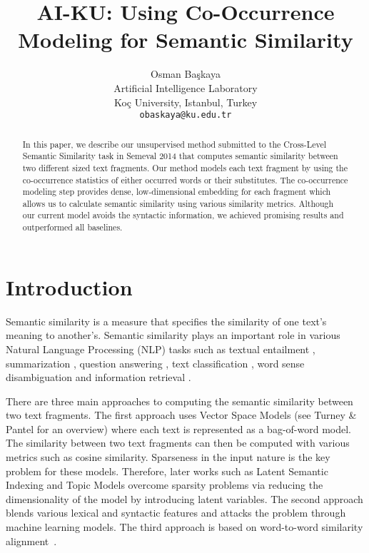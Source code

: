 \documentclass[11pt]{article}
\title{AI-KU: Using Co-Occurrence Modeling for Semantic Similarity}
\author{Osman Ba\c{s}kaya \\
	  Artificial Intelligence Laboratory \\
	  Ko\c{c} University, Istanbul, Turkey \\
  {\tt obaskaya@ku.edu.tr} \\
  }
\date{}
\begin{document}
\maketitle
\begin{abstract}

In this paper, we describe our unsupervised method submitted to the Cross-Level Semantic Similarity task in Semeval 2014 that computes semantic similarity between two different sized text fragments. Our method models each text fragment by using the co-occurrence statistics of either occurred words or their substitutes. The co-occurrence modeling step provides dense, low-dimensional embedding for each fragment which allows us to calculate semantic similarity using various similarity metrics. Although our current model avoids the syntactic information, we achieved promising results and outperformed all baselines.

\end{abstract}

\section{Introduction}
\label{intro}

Semantic similarity is a measure that specifies the similarity of one text's meaning to another's. Semantic similarity plays an important role in various Natural Language Processing (NLP) tasks such as textual entailment \cite{berant2012entail}, summarization \cite{lin2003summarization}, question answering \cite{surdeanu2011questionans}, text classification \cite{sebastiani2002textclass}, word sense disambiguation \cite{schutze98automatic} and information retrieval \cite{park2005infret}. 

There are three main approaches to computing the semantic similarity between two text fragments. The first approach uses Vector Space Models (see Turney \& Pantel  for an overview) where each text is represented as a bag-of-word model. The similarity between two text fragments can then be computed with various metrics such as cosine similarity. Sparseness in the input nature is the key problem for these models. Therefore, later works such as Latent Semantic Indexing  \cite{deerwester90indexing} and Topic Models \cite{blei03latent} overcome sparsity problems via reducing the dimensionality of the model by introducing latent variables. The second approach blends various lexical and syntactic features and attacks the problem through machine learning models. The third approach is based on word-to-word similarity alignment~\cite{pilehvar2013align,islam2008semantic}.
\end{document}
